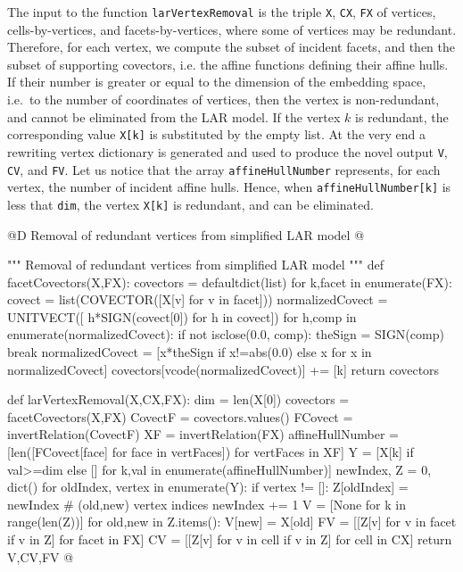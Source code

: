 \documentclass[11pt,oneside]{article}	%
\begin{document}
The input to the function \texttt{larVertexRemoval} is the triple \texttt{X}, \texttt{CX}, \texttt{FX} of vertices, cells-by-vertices, and facets-by-vertices, where some of vertices may be redundant.
Therefore, for each vertex, we compute the subset of incident facets, and then the subset of supporting covectors, i.e. the affine functions defining their affine hulls. If their number is greater or equal to the dimension of the embedding space, i.e.~to the number of coordinates of vertices,  then the vertex is non-redundant, and cannot be eliminated from the LAR model. If the vertex $k$ is redundant, the corresponding value \texttt{X[k]} is substituted by the empty list. At the very end a rewriting vertex dictionary is generated and used to produce the novel output \texttt{V}, \texttt{CV}, and \texttt{FV}.
Let us notice that the array \texttt{affineHullNumber} represents, for each vertex, the number of incident affine hulls. Hence, when \texttt{affineHullNumber[k]} is less that \texttt{dim}, the vertex \texttt{X[k]} is redundant, and can be eliminated.


@D Removal of redundant vertices from simplified LAR model
@{""" Removal of redundant vertices from simplified LAR model """
def facetCovectors(X,FX):
	covectors = defaultdict(list) 
	for k,facet in enumerate(FX):
		covect = list(COVECTOR([X[v] for v in facet]))
		normalizedCovect = UNITVECT([ h*SIGN(covect[0])  for h in covect])
		for h,comp in enumerate(normalizedCovect): 
			if not isclose(0.0, comp): 
				theSign = SIGN(comp)
				break
		normalizedCovect = [x*theSign  if x!=abs(0.0) else x for x in normalizedCovect]
		covectors[vcode(normalizedCovect)] += [k]
	return covectors

def larVertexRemoval(X,CX,FX):
	dim = len(X[0])
	covectors = facetCovectors(X,FX)
	CovectF = covectors.values()
	FCovect = invertRelation(CovectF)
	XF = invertRelation(FX)
	affineHullNumber = [len([FCovect[face] for face in vertFaces]) for vertFaces in XF]
	Y = [X[k] if val>=dim else [] for k,val in enumerate(affineHullNumber)]
	newIndex, Z = 0, dict()
	for oldIndex, vertex in enumerate(Y):
		if vertex != []:
			Z[oldIndex] = newIndex  # (old,new) vertex indices
			newIndex += 1
	V = [None for k in range(len(Z))]
	for old,new in Z.items():
		V[new] = X[old]
	FV = [[Z[v] for v in facet if v in Z] for facet in FX]
	CV = [[Z[v] for v in cell if v in Z] for cell in CX]
	return V,CV,FV
@}
\end{document}
